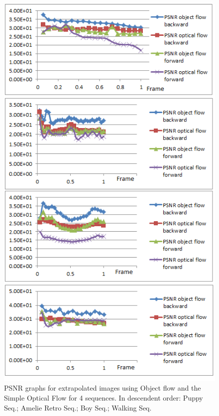    \begin{figure}[thpb]
      \centering
      \includegraphics[height=0.85\textheight]{images/ResultsOF.png}
      \caption{PSNR graphs for extrapolated images using Object flow and the Simple Optical Flow for 4 sequences. In descendent order: Puppy Seq.; Amelie Retro Seq.; Boy Seq.; Walking Seq.}
      \label{of_res}
   \end{figure}
